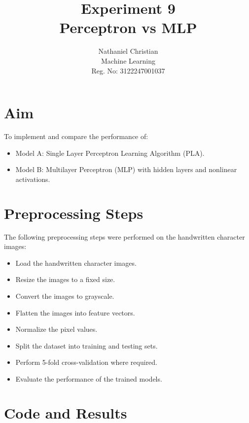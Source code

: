 \documentclass[12pt,a4paper]{article}
\title{\textbf{Experiment 9}\\Perceptron vs MLP}
\author{Nathaniel Christian\\Machine Learning\\Reg. No: 3122247001037}
\date{}
\begin{document}
\maketitle

\section{Aim}
To implement and compare the performance of:
\begin{itemize}
    \item Model A: Single Layer Perceptron Learning Algorithm (PLA).
    \item Model B: Multilayer Perceptron (MLP) with hidden layers and nonlinear activations.
\end{itemize}

\section{Preprocessing Steps}
The following preprocessing steps were performed on the handwritten character images:
\begin{itemize}
    \item Load the handwritten character images.
    \item Resize the images to a fixed size.
    \item Convert the images to grayscale.
    \item Flatten the images into feature vectors.
    \item Normalize the pixel values.
    \item Split the dataset into training and testing sets.
    \item Perform 5-fold cross-validation where required.
    \item Evaluate the performance of the trained models.
\end{itemize}

\section{Code and Results}
\end{document}
